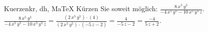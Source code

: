 \begin{MAufgabe}{Kuerzen}{kr, dh, MaTeX}
K\"urzen Sie soweit m\"oglich: $\frac{8\, x^5\, y^5}{ - 4\, x^5\, y^5 - 10\, x^5\, y^5\, z}$.\\ 
\ifLsg\MLoesung
\quad $\frac{8\, x^5\, y^5}{ - 4\, x^5\, y^5 - 10\, x^5\, y^5\, z}=\frac{(2\, x^5\, y^5)\cdot(4)}{(2\, x^5\, y^5)\cdot( - 5\, z - 2)}=\frac{4}{ - 5\, z - 2}=\frac{-4}{5\, z + 2}$.\else\relax\fi
 \end{MAufgabe}